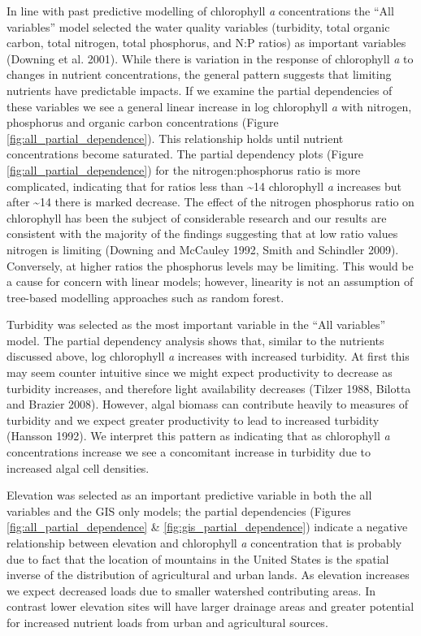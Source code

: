 \documentclass[12pt,]{article}
\begin{document}
In line with past predictive modelling of chlorophyll \emph{a}
concentrations the ``All variables'' model selected the water quality
variables (turbidity, total organic carbon, total nitrogen, total
phosphorus, and N:P ratios) as important variables (Downing et al.
2001). While there is variation in the response of chlorophyll \emph{a}
to changes in nutrient concentrations, the general pattern suggests that
limiting nutrients have predictable impacts. If we examine the partial
dependencies of these variables we see a general linear increase in log
chlorophyll \emph{a} with nitrogen, phosphorus and organic carbon
concentrations (Figure \ref{fig:all_partial_dependence}). This
relationship holds until nutrient concentrations become saturated. The
partial dependency plots (Figure \ref{fig:all_partial_dependence}) for
the nitrogen:phosphorus ratio is more complicated, indicating that for
ratios less than \textasciitilde{}14 chlorophyll \emph{a} increases but
after \textasciitilde{}14 there is marked decrease. The effect of the
nitrogen phosphorus ratio on chlorophyll has been the subject of
considerable research and our results are consistent with the majority
of the findings suggesting that at low ratio values nitrogen is limiting
(Downing and McCauley 1992, Smith and Schindler 2009). Conversely, at
higher ratios the phosphorus levels may be limiting. This would be a
cause for concern with linear models; however, linearity is not an
assumption of tree-based modelling approaches such as random forest.

Turbidity was selected as the most important variable in the ``All
variables'' model. The partial dependency analysis shows that, similar
to the nutrients discussed above, log chlorophyll \emph{a} increases
with increased turbidity. At first this may seem counter intuitive since
we might expect productivity to decrease as turbidity increases, and
therefore light availability decreases (Tilzer 1988, Bilotta and Brazier
2008). However, algal biomass can contribute heavily to measures of
turbidity and we expect greater productivity to lead to increased
turbidity (Hansson 1992). We interpret this pattern as indicating that
as chlorophyll \emph{a} concentrations increase we see a concomitant
increase in turbidity due to increased algal cell densities.

Elevation was selected as an important predictive variable in both the
all variables and the GIS only models; the partial dependencies (Figures
\ref{fig:all_partial_dependence} \& \ref{fig:gis_partial_dependence})
indicate a negative relationship between elevation and chlorophyll
\emph{a} concentration that is probably due to fact that the location of
mountains in the United States is the spatial inverse of the
distribution of agricultural and urban lands. As elevation increases we
expect decreased loads due to smaller watershed contributing areas. In
contrast lower elevation sites will have larger drainage areas and
greater potential for increased nutrient loads from urban and
agricultural sources.
\end{document}
